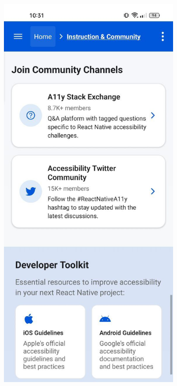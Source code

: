 \FloatBarrier

\begin{figure}[ht]
    \centering
    \begin{subfigure}[b]{0.48\textwidth}
        \centering
        \includegraphics[width=\linewidth, alt={Third part of the Instruction and community screen}]{img/instruction3.jpg}

\end{subfigure}
\end{figure}

